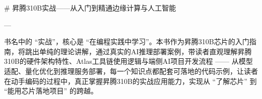 # 昇腾310B实战——从入门到精通边缘计算与人工智能

---

书名中的 “实战”，核心是 “在编程实践中学习”。本书作为昇腾310B芯片的入门指南，将跳出单纯的理论讲解，通过真实的AI推理部署案例，带读者直观理解昇腾310B的硬件架构特性、Atlas工具链使用逻辑与端侧AI项目开发流程 —— 从模型适配、量化优化到推理服务部署，每一个知识点都配套可落地的代码示例，让读者在动手编码的过程中，真正掌握昇腾310B的实战应用能力，实现从 “了解芯片” 到 “能用芯片落地项目” 的跨越。